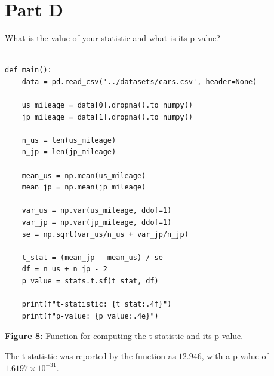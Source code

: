 \section{Part D}
What is the value of your statistic and what is its p-value?\\
-----

\begin{verbatim}
def main():
    data = pd.read_csv('../datasets/cars.csv', header=None)
    
    us_mileage = data[0].dropna().to_numpy()
    jp_mileage = data[1].dropna().to_numpy()

    n_us = len(us_mileage)
    n_jp = len(jp_mileage)
    
    mean_us = np.mean(us_mileage)
    mean_jp = np.mean(jp_mileage)
    
    var_us = np.var(us_mileage, ddof=1)
    var_jp = np.var(jp_mileage, ddof=1)
    se = np.sqrt(var_us/n_us + var_jp/n_jp)
    
    t_stat = (mean_jp - mean_us) / se
    df = n_us + n_jp - 2
    p_value = stats.t.sf(t_stat, df)
    
    print(f"t-statistic: {t_stat:.4f}")
    print(f"p-value: {p_value:.4e}")
\end{verbatim}

\begin{center}
    \textbf{Figure 8:} Function for computing the t statistic and its p-value.\\
\end{center}

The t-statistic was reported by the function as $ 12.946 $, with a p-value of $ 1.6197 \times 10^{-31} $.

\newpage
